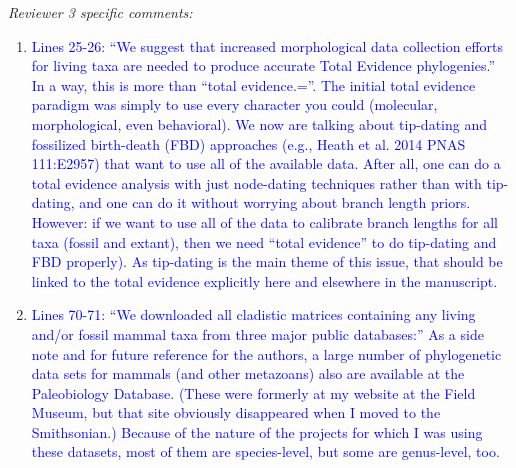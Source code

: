 \documentclass[12pt,letterpaper]{article}
\renewcommand{\subsection}[1]{%
\bigskip
\begin{center}
\begin{large}
\normalfont\itshape #1
\end{large}
\end{center}}
\begin{document}
\subsection{Reviewer 3 specific comments:}
\begin{enumerate}
\item{\textcolor{blue}{Lines 25-26: ``We suggest that increased morphological data collection efforts for living taxa are needed to produce accurate Total Evidence phylogenies.''
In a way, this is more than ``total evidence.=''.
The initial total evidence paradigm was simply to use every character you could (molecular, morphological, even behavioral).
We now are talking about tip-dating and fossilized birth-death (FBD) approaches (e.g., Heath et al. 2014 PNAS 111:E2957) that want to use all of the available data.
After all, one can do a total evidence analysis with just node-dating techniques rather than with tip-dating, and one can do it without worrying about branch length priors.
However: if we want to use all of the data to calibrate branch lengths for all taxa (fossil and extant), then we need ``total evidence'' to do tip-dating and FBD properly).
As tip-dating is the main theme of this issue, that should be linked to the total evidence explicitly here and elsewhere in the manuscript.}}

\item{\textcolor{blue}{Lines 70-71: ``We downloaded all cladistic matrices containing any living and/or fossil mammal  taxa from three major public databases:''
As a side note and for future reference for the authors, a large number of phylogenetic data sets for mammals (and other metazoans) also are available at the Paleobiology Database.
(These were formerly at my website at the Field Museum, but that site obviously disappeared when I moved to the Smithsonian.)
Because of the nature of the projects for which I was using these datasets, most of them are species-level, but some are genus-level, too.}}



\end{enumerate}
\end{document}
